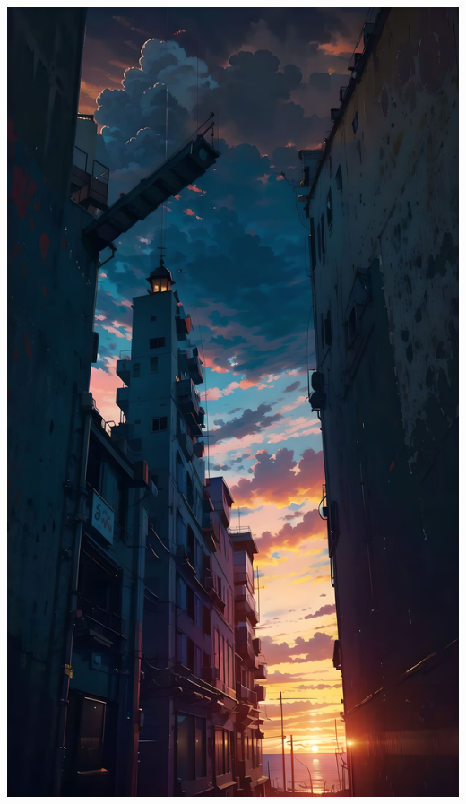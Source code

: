 \documentclass{xNoteBook}
\begin{document}

\maketitle

\frontmatter
\makesymb

\begin{center}
    \includegraphics[width=13.5cm]{image/017.jpeg}
\end{center}
\end{document}
